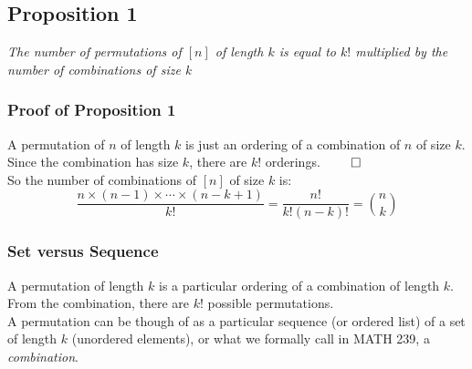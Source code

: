 \documentclass{report}
\begin{document}
\subsection{Proposition 1}
\begin{center}
\textit{The number of permutations of $[n]$ of length $k$ is equal to $k!$ multiplied by the number of combinations of size k}
\end{center}
\subsubsection{Proof of Proposition 1}
A permutation of $n$ of length $k$ is just an ordering of a combination of $n$ of size $k$. Since the combination has size $k$, there are $k!$ orderings. $\qed$\\So the number of combinations of $[n]$ of size $k$ is:
$$\frac{n \times (n-1) \times \cdots \times (n-k+1)}{k!} = \frac{n!}{k!(n-k)!} = {n \choose k}$$
\subsubsection{Set versus Sequence}
A permutation of length $k$ is a particular ordering of a combination of length $k$. From the combination, there are $k!$ possible permutations.\\
A permutation can be though of as a particular sequence (or ordered list) of a set of length $k$ (unordered elements), or what we formally call in MATH 239, a \textit{combination}.
\end{document}
